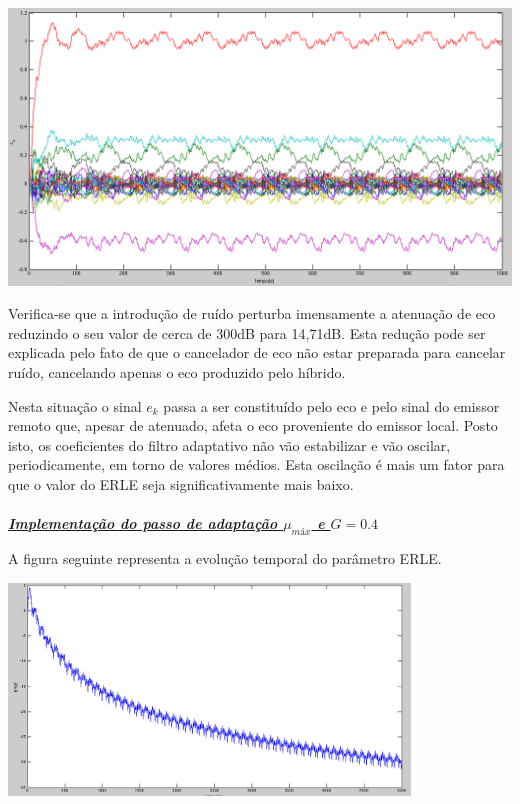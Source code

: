 \documentclass[a4paper,11pt]{report}
\begin{document}
\begin{center}
     \includegraphics[angle=0,width=1\textwidth]{c_k_G0_1}
     \label{fig:SRuRUIDOt}
\end{center}
     
Verifica-se que a introdução de ruído perturba imensamente a atenuação de eco reduzindo o seu valor de cerca de 300dB para 14,71dB. Esta redução pode ser explicada pelo fato de que o cancelador de eco não estar preparada para cancelar ruído, cancelando apenas o eco produzido pelo híbrido.

Nesta situação o sinal $e_k$ passa a ser constituído pelo eco e pelo sinal do emissor remoto que, apesar de atenuado, afeta o eco proveniente do emissor local. Posto isto, os coeficientes do filtro adaptativo não vão estabilizar e vão oscilar, periodicamente, em torno de valores médios. Esta oscilação é mais um fator para que o valor do ERLE seja significativamente mais baixo.
\paragraph{}


\large\underline{{\textit{\textbf{Implementação do passo de adaptação $\mu_{máx}$ e $G=0.4$}}}}\\
\par

A figura seguinte representa a evolução temporal do parâmetro ERLE.

\begin{center}
     \includegraphics[angle=0,width=0.8\textwidth]{ERLE_G0_4_umax}
     \label{fig:SRuERLEt}
\end{center}
\end{document}
